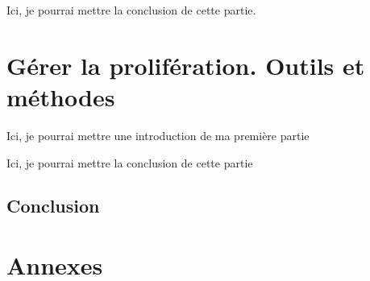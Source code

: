\documentclass[12pt,twoside]{book}
\begin{document}
	
Ici, je pourrai mettre la conclusion  de cette partie.
	
	
	\part{Gérer la prolifération. Outils et méthodes}
	
	
	
	Ici, je pourrai mettre une introduction de ma première partie
	
	
	
	
	


	Ici, je pourrai mettre la conclusion de cette partie
	
	
\chapter*{Conclusion}
\newpage{\pagestyle{empty}\cleardoublepage}
	








\appendix %

\part*{Annexes}
\end{document}
